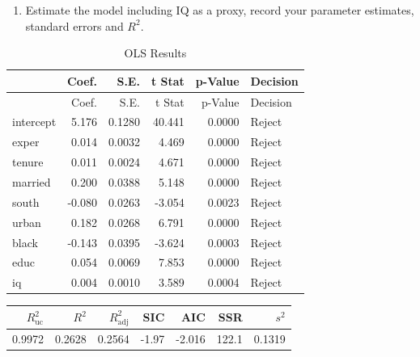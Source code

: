 \documentclass[11pt,]{article}
\newenvironment{Shaded}{\begin{snugshade}}{\end{snugshade}}
\newcommand{\KeywordTok}[1]{\textcolor[rgb]{0.13,0.29,0.53}{\textbf{#1}}}
\newcommand{\DataTypeTok}[1]{\textcolor[rgb]{0.13,0.29,0.53}{#1}}
\newcommand{\StringTok}[1]{\textcolor[rgb]{0.31,0.60,0.02}{#1}}
\newcommand{\OperatorTok}[1]{\textcolor[rgb]{0.81,0.36,0.00}{\textbf{#1}}}
\newcommand{\NormalTok}[1]{#1}
\providecommand{\tightlist}{%
  \setlength{\itemsep}{0pt}\setlength{\parskip}{0pt}}
\begin{document}
\begin{enumerate}
\def\labelenumi{(\alph{enumi})}
\setcounter{enumi}{2}
\tightlist
\item
  Estimate the model including IQ as a proxy, record your parameter
  estimates, standard errors and \(R^2\).
\end{enumerate}

\begin{Shaded}
\end{Shaded}

\begin{longtable}[]{@{}lrrrrl@{}}
\caption{OLS Results}\tabularnewline
\toprule
& Coef. & S.E. & t Stat & p-Value & Decision\tabularnewline
\midrule
\endfirsthead
\toprule
& Coef. & S.E. & t Stat & p-Value & Decision\tabularnewline
\midrule
\endhead
intercept & 5.176 & 0.1280 & 40.441 & 0.0000 & Reject\tabularnewline
exper & 0.014 & 0.0032 & 4.469 & 0.0000 & Reject\tabularnewline
tenure & 0.011 & 0.0024 & 4.671 & 0.0000 & Reject\tabularnewline
married & 0.200 & 0.0388 & 5.148 & 0.0000 & Reject\tabularnewline
south & -0.080 & 0.0263 & -3.054 & 0.0023 & Reject\tabularnewline
urban & 0.182 & 0.0268 & 6.791 & 0.0000 & Reject\tabularnewline
black & -0.143 & 0.0395 & -3.624 & 0.0003 & Reject\tabularnewline
educ & 0.054 & 0.0069 & 7.853 & 0.0000 & Reject\tabularnewline
iq & 0.004 & 0.0010 & 3.589 & 0.0004 & Reject\tabularnewline
\bottomrule
\end{longtable}

\begin{Shaded}
\end{Shaded}

\begin{longtable}[]{@{}rrrrrrr@{}}
\toprule
\(R^2_\text{uc}\) & \(R^2\) & \(R^2_\text{adj}\) & SIC & AIC & SSR &
\(s^2\)\tabularnewline
\midrule
\endhead
0.9972 & 0.2628 & 0.2564 & -1.97 & -2.016 & 122.1 &
0.1319\tabularnewline
\bottomrule
\end{longtable}
\end{document}
